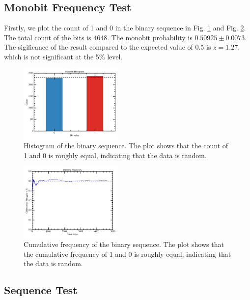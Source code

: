 \subsection{Monobit Frequency Test}
Firstly, we plot the count of 1 and 0 in the binary sequence in Fig. \ref{fig:monobit_histogram} and Fig. \ref{fig:running_frequency}. The total count of the bits is 4648. The monobit probability is $0.50925 \pm 0.0073$. The sigificance of the result compared to the expected value of 0.5 is $z=1.27$, which is not significant at the 5\% level. 
\begin{figure}
\centering
\includegraphics[width=0.45\textwidth]{figure/monobit_histogram.png}
\caption{Histogram of the binary sequence. The plot shows that the count of 1 and 0 is roughly equal, indicating that the data is random.}
\label{fig:monobit_histogram}
\end{figure}
\begin{figure}
\centering
\includegraphics[width=0.45\textwidth]{figure/running_frequency.png}
\caption{Cumulative frequency of the binary sequence. The plot shows that the cumulative frequency of 1 and 0 is roughly equal, indicating that the data is random.}
\label{fig:running_frequency}

\end{figure}

\subsection{Sequence Test}

